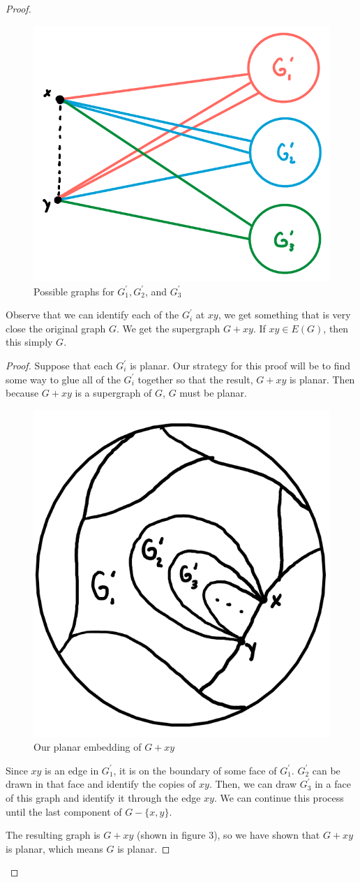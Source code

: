 \documentclass[12pt]{article}
\theoremstyle{definition}
\begin{document}
\begin{proof}
     \begin{figure}[hbt!]
        \centering
        \includegraphics[width=0.40\linewidth]{graphs/connect_components_and_xy.png}
        \caption{Possible graphs for $G_1^{\prime}, G_2^{\prime}$, and $G_3^{\prime}$}
    \end{figure}
    \noindent Observe that we can identify each of the $G_i^{\prime}$ at $xy$, we get something that is very close the original graph $G$. We get the supergraph $G + xy$. If $xy \in E(G)$, then this simply $G$.

    \begin{proof}
        Suppose that each $G_i^{\prime}$  is planar.
        Our strategy for this proof will be to find some way to glue all of the $G_i^{\prime}$ together so that the result, $G + xy$ is planar.
        Then because $G + xy$ is a supergraph of $G$, $G$ must be planar.
        \begin{figure}
            \centering
            \includegraphics[width=0.25\linewidth]{graphs/embedding_G_xy.png}
            \caption{Our planar embedding of $G + xy$}
        \end{figure}

        Since $xy$ is an edge in $G_1^{\prime}$, it is on the boundary of some face of $G_1^{\prime}$. $G_2^{\prime}$ can be drawn in that face and identify the copies of $xy$. Then, we can draw $G_3^{\prime}$ in a face of this graph and identify it through the edge $xy$. We can continue this process until the last component of $G - \{x,y\}$.

        The resulting graph is $G + xy$ (shown in figure $3$), so we have shown that $G + xy$ is planar, which means $G$ is planar.
    \end{proof}


\end{proof}
\end{document}
